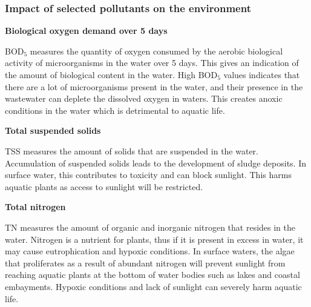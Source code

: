 \documentclass[preprint,12pt,authoryear]{elsarticle}
\begin{document}
\subsubsection{Impact of selected pollutants on the environment}
\noindent\textbf{Biological oxygen demand over 5 days}

BOD$_5$ measures the quantity of oxygen consumed by the aerobic biological activity of microorganisms in the water over 5 days. This gives an indication of the amount of biological content in the water. High BOD$_5$ values indicates that there are a lot of microorganisms present in the water, and their presence in the wastewater can deplete the dissolved oxygen in waters. This creates anoxic conditions in the water which is detrimental to aquatic life. \citep{usepa2002}

\noindent\textbf{Total suspended solids}

TSS measures the amount of solids that are suspended in the water. Accumulation of suspended solids leads to the development of sludge deposits. In surface water, this contributes to toxicity and can block sunlight. This harms aquatic plants as access to sunlight will be restricted. \citep{usepa2002}

\noindent\textbf{Total nitrogen}

TN measures the amount of organic and inorganic nitrogen that resides in the water. Nitrogen is a nutrient for plants, thus if it is present in excess in water, it may cause eutrophication and hypoxic conditions. In surface waters, the algae that proliferates as a result of abundant nitrogen will prevent sunlight from reaching aquatic plants at the bottom of water bodies such as lakes and coastal embayments. Hypoxic conditions and lack of sunlight can severely harm aquatic life. \citep{usepa2002}
\end{document}
